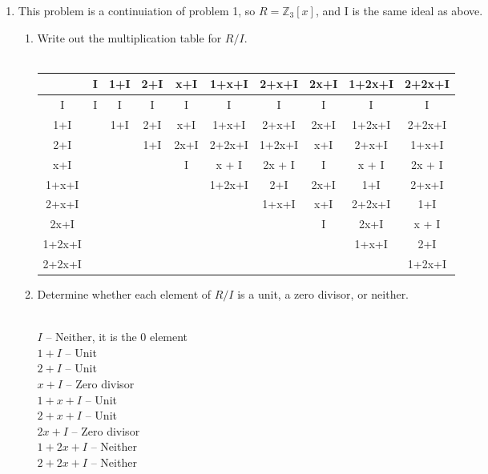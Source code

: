 \begin{enumerate}
    \item This problem is a continuiation of problem 1, so $R = \mathds{Z}_3[x]$, and I is the same ideal as above.
      \begin{enumerate}
        \item Write out the multiplication table for $R/I$.\\\\
          \begin{center}
            \begin{tabular}{ |c||c c c c c c c c c| }
              \hline
                 & I & 1+I & 2+I & x+I & 1+x+I & 2+x+I & 2x+I & 1+2x+I & 2+2x+I\\
                 \hline \hline
               I & I & I & I & I & I & I & I & I & I \\
               1+I &  & 1+I & 2+I & x+I & 1+x+I & 2+x+I & 2x+I & 1+2x+I & 2+2x+I\\
               2+I &  &  & 1+I & 2x+I & 2+2x+I & 1+2x+I & x+I & 2+x+I & 1+x+I\\
               x+I &  &  &  &  I & x + I & 2x + I & I & x + I & 2x + I\\
               1+x+I &  &  &  &  & 1+2x+I & 2+I & 2x+I & 1+I & 2+x+I\\
               2+x+I & & & & & & 1+x+I & x+I & 2+2x+I & 1+I\\
               2x+I & & & & & & & I & 2x+I & x + I\\
               1+2x+I & & & & & & & & 1+x+I & 2+I\\
               2+2x+I & & & & & & & & & 1+2x+I\\
               \hline
            \end{tabular}
          \end{center}          

        \item Determine whether each element of $R/I$ is a unit, a zero divisor, or neither.\\\\
         \begin{center}
           $I$ -- Neither, it is the 0 element\\
           $1+I$ -- Unit\\
           $2+I$ -- Unit\\
           $x+I$ -- Zero divisor\\
           $1+x+I$ -- Unit\\
           $2+x+I$ -- Unit\\
           $2x+I$ -- Zero divisor\\
           $1+2x+I$ -- Neither\\
           $2+2x+I$ -- Neither\\
         \end{center}


\end{enumerate}
\end{enumerate}
